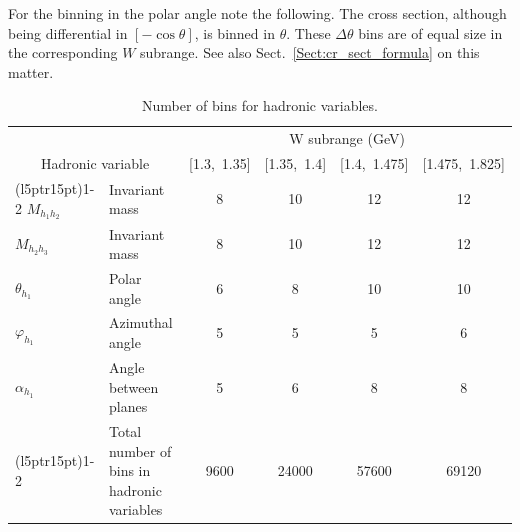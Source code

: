 For the binning in the polar angle note the following. The cross section, although being differential in $[-\cos\theta]$, is binned in $\theta$. These $\Delta \theta$ bins are of equal size in the corresponding $W$ subrange. See also Sect.~\ref{Sect:cr_sect_formula} on this matter.


\vspace{0.5em}
\begin{table}[htb]\normalsize
\centering 
  \caption{\small Number of bins for hadronic variables.} \label{tab:summary_bins}
  \begin{tabular}{lm{4cm}cccc}
    \toprule
    & & \multicolumn{4}{c}{W subrange (GeV)} \\
    \multicolumn{2}{c}{\centering Hadronic variable }  & [1.3,~1.35] & [1.35,~1.4] & [1.4,~1.475] & [1.475,~1.825] \\
    \cmidrule(l{5pt}r{15pt}){1-2} \cmidrule(l{5pt}r{5pt}){3-6}
    $M_{h_{1}h_{2}}$   & Invariant mass       &   8  & 10 & 12 & 12  \\
    $M_{h_{2}h_{3}}$   & Invariant mass       &   8  & 10 & 12 & 12  \\
    $\theta_{h_{1}}$   & Polar angle          &   6  & 8  & 10 & 10  \\
    $\varphi_{h_{1}}$  & Azimuthal angle      &   5  & 5  & 5  & 6   \\
    $\alpha_{h_{1}}$   & Angle between planes &   5  & 6  & 8  & 8   \\
    \cmidrule(l{5pt}r{15pt}){1-2} \cmidrule(l{5pt}r{5pt}){3-6}
              & Total number of bins \newline in hadronic variables &   9600  & 24000  & 57600  & 69120   \\
    \bottomrule
  \end{tabular}
\end{table}
\vspace{0.5em}

